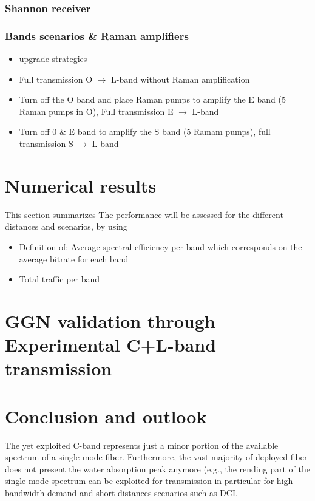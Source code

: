 \documentclass[journal]{IEEEtran}
\begin{document}
\subsubsection{Shannon receiver}
\subsubsection{Bands scenarios \& Raman amplifiers}
\begin{itemize}
    \item upgrade strategies
    \item Full transmission O $\longrightarrow$ L-band without Raman amplification
    \item Turn off the O band and place Raman pumps to amplify the E band (5 Raman pumps in O), Full transmission E $\longrightarrow$ L-band
    \item Turn off 0 \& E band to amplify the S band (5 Ramam pumps), full transmission S $\longrightarrow$ L-band
\end{itemize}

\section{Numerical results}\label{Sec:results}
This section summarizes 
The performance will be assessed for the different distances and scenarios, by using 
\begin{itemize}
    \item Definition of: Average spectral efficiency per band which corresponds on the average bitrate for each band
    \item Total traffic per band
\end{itemize}
\section{GGN validation through Experimental C+L-band transmission}\label{Sec:Exp}
\section{Conclusion and outlook}\label{Sec:Conclusions}
The yet exploited C-band represents just a minor portion of the available spectrum of a single-mode fiber. Furthermore, the vast majority of deployed fiber does not present the water absorption peak anymore (e.g., the rending part of the single mode spectrum can be exploited for transmission in particular for high-bandwidth demand and short distances scenarios such as DCI.
\end{document}
